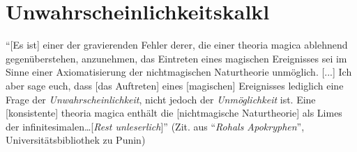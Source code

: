 \chapter[tocentry=Unwahrscheinlichkeitskalkül, head=Unwahrscheinlichkeitskalkül]{Unwahrscheinlichkeitskalk\uech l}
"`[Es ist] einer der gravierenden Fehler derer, die einer theoria magica ablehnend gegenüberstehen, anzunehmen, das Eintreten eines magischen Ereignisses sei im Sinne einer Axiomatisierung der nichtmagischen Naturtheorie unmöglich. [...] Ich aber sage euch, dass [das Auftreten] eines [magischen] Ereignisses lediglich eine Frage der \emph{Unwahrscheinlichkeit}, nicht jedoch der \emph{Unmöglichkeit} ist. Eine [konsistente] theoria magica enthält die [nichtmagische Naturtheorie] als Limes der infinitesimalen\ldots [\textit{Rest unleserlich}]"' (Zit. aus "`\emph{Rohals Apokryphen}"', Universitätsbibliothek zu Punin)


